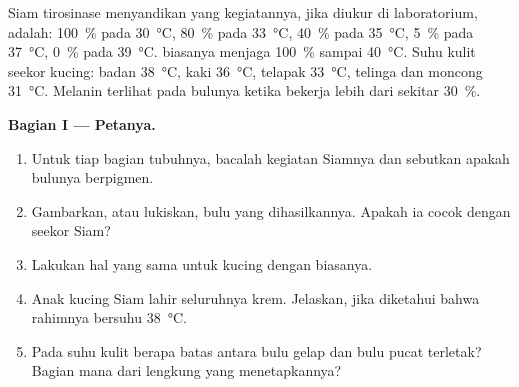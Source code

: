 \begin{problem}
\label{pb:g11:enzymes-and-phenotype:1}
 Siam  tirosinase menyandikan  yang kegiatannya, jika
diukur di laboratorium, adalah: \qty{100}{\percent} pada
\qty{30}{\celsius}, \qty{80}{\percent} pada \qty{33}{\celsius},
\qty{40}{\percent} pada \qty{35}{\celsius}, \qty{5}{\percent} pada
\qty{37}{\celsius}, \qty{0}{\percent} pada \qty{39}{\celsius}. 
 biasanya menjaga \qty{100}{\percent} sampai \qty{40}{\celsius}.
Suhu kulit seekor kucing: badan \qty{38}{\celsius}, kaki
\qty{36}{\celsius}, telapak \qty{33}{\celsius}, telinga dan moncong
\qty{31}{\celsius}. Melanin terlihat pada bulunya ketika 
bekerja lebih dari sekitar \qty{30}{\percent}.

\medskip
\noindent\textbf{Bagian I --- Petanya.}
\begin{enumerate}
  \item Untuk tiap bagian tubuhnya, bacalah kegiatan  Siamnya dan
        sebutkan apakah bulunya berpigmen.
  \item Gambarkan, atau lukiskan, bulu yang dihasilkannya. Apakah ia
        cocok dengan seekor Siam?
  \item Lakukan hal yang sama untuk kucing dengan  biasanya.
  \item Anak kucing Siam lahir seluruhnya krem. Jelaskan, jika
        diketahui bahwa rahimnya bersuhu \qty{38}{\celsius}.
  \item Pada suhu kulit berapa batas antara bulu gelap dan bulu pucat
        terletak? Bagian mana dari lengkung  yang menetapkannya?
\end{enumerate}


\end{problem}

